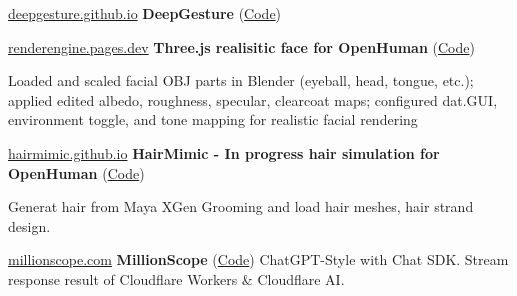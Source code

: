 


\begin{twocolentry}{\href{https://deepgesture.github.io}{deepgesture.github.io}}
	\textbf{DeepGesture} (\href{https://github.com/DeepGesture/DeepGesture}{Code})
\end{twocolentry}


\begin{twocolentry}{\href{https://renderengine.pages.dev}{renderengine.pages.dev}}
	\textbf{Three.js realisitic face for OpenHuman} (\href{https://github.com/openhuman-ai/renderengine}{Code})
	\begin{highlights}
		\item Loaded and scaled facial OBJ parts in Blender (eyeball, head, tongue, etc.); applied edited albedo, roughness, specular, clearcoat maps; configured dat.GUI, environment toggle, and tone mapping for realistic facial rendering
	\end{highlights}
\end{twocolentry}

\begin{twocolentry}{\href{https://hairmimic.github.io}{hairmimic.github.io}}
	\textbf{HairMimic - In progress hair simulation for OpenHuman} (\href{https://github.com/hairmimic/hairmimic.github.io}{Code})
	\begin{highlights}
			\item Generat hair from Maya XGen Grooming and load hair meshes, hair strand design.
	\end{highlights}
\end{twocolentry}




\cvspace

\begin{twocolentry}{\href{https://millionscope.com}{millionscope.com}}
	\textbf{MillionScope}  (\href{https://github.com/millionscope/millionscope.github.io}{Code}) ChatGPT-Style with Chat SDK. Stream response result of Cloudflare Workers \& Cloudflare AI.
\end{twocolentry}

